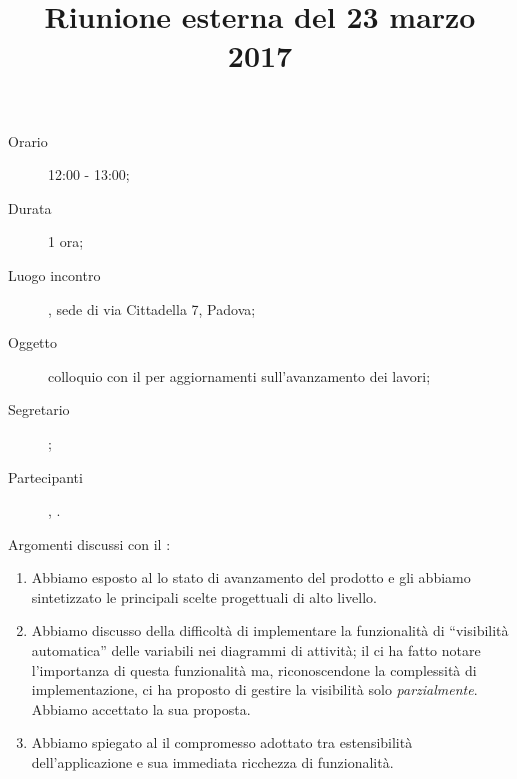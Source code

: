 


\author{\LS}
\supervisor{\GG}
\title{Riunione esterna del 23 marzo 2017}



\maketitle

\begin{description}
	\item[Orario] 12:00 - 13:00;
	\item[Durata] 1 ora;
	\item[Luogo incontro] \ZU, sede di via Cittadella 7, Padova;
	\item[Oggetto] colloquio con il \GP{} per aggiornamenti sull'avanzamento dei lavori;
	\item[Segretario] \LS; 
	\item[Partecipanti] \GP, \ALL.
\end{description}

Argomenti discussi con il \GP:
\begin{enumerate}
	\item Abbiamo esposto al \GP{} lo stato di avanzamento del prodotto e gli abbiamo sintetizzato le principali scelte progettuali di alto livello.
	\item Abbiamo discusso della difficoltà di implementare la funzionalità di “visibilità automatica” delle variabili nei diagrammi di attività; il \GP{} ci ha fatto notare l'importanza di questa funzionalità ma, riconoscendone la complessità di implementazione, ci ha proposto di gestire la visibilità solo \emph{parzialmente}. Abbiamo accettato la sua proposta.
	\item Abbiamo spiegato al \GP{} il compromesso adottato tra estensibilità dell'applicazione e sua immediata ricchezza di funzionalità.
\end{enumerate}


